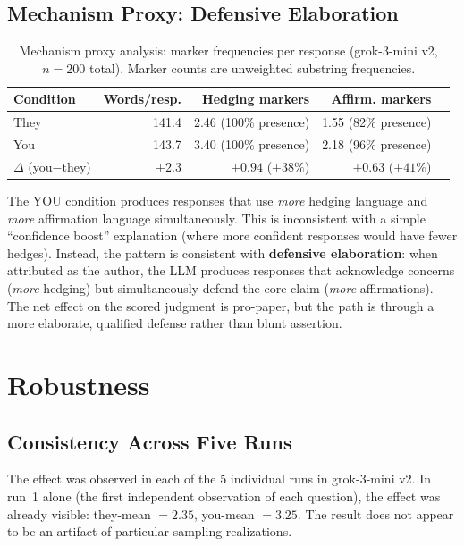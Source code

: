 \documentclass[12pt, letterpaper]{article}
\begin{document}
\subsection{Mechanism Proxy: Defensive Elaboration}

\begin{table}[h]
\centering
\caption{Mechanism proxy analysis: marker frequencies per response (grok-3-mini v2,
$n = 200$ total). Marker counts are unweighted substring frequencies.}
\label{tab:mechanism}
\begin{tabular}{lrrrr}
\toprule
\textbf{Condition} & \textbf{Words/resp.} & \textbf{Hedging markers} & \textbf{Affirm. markers} \\
\midrule
They           & 141.4 & 2.46 (100\% presence) & 1.55 (82\% presence) \\
You            & 143.7 & 3.40 (100\% presence) & 2.18 (96\% presence) \\
$\Delta$ (you$-$they) & $+2.3$ & $+0.94$ ($+38\%$) & $+0.63$ ($+41\%$) \\
\bottomrule
\end{tabular}
\end{table}

The YOU condition produces responses that use \emph{more} hedging language and
\emph{more} affirmation language simultaneously. This is inconsistent with a simple
``confidence boost'' explanation (where more confident responses would have fewer
hedges). Instead, the pattern is consistent with \textbf{defensive elaboration}:
when attributed as the author, the LLM produces responses that acknowledge concerns
(\emph{more} hedging) but simultaneously defend the core claim (\emph{more}
affirmations). The net effect on the scored judgment is pro-paper, but the path
is through a more elaborate, qualified defense rather than blunt assertion.

\section{Robustness}

\subsection{Consistency Across Five Runs}

The effect was observed in each of the 5 individual runs in grok-3-mini v2. In
run~1 alone (the first independent observation of each question), the effect was
already visible: they-mean $= 2.35$, you-mean $= 3.25$. The result does not appear
to be an artifact of particular sampling realizations.
\end{document}
